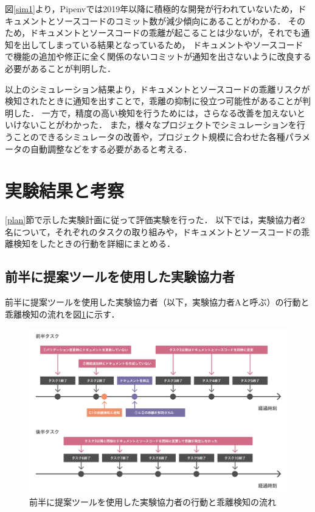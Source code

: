 図\ref{sim1}より，Pipenvでは2019年以降に積極的な開発が行われていないため，ドキュメントとソースコードのコミット数が減少傾向にあることがわかる．
そのため，ドキュメントとソースコードの乖離が起こることは少ないが，それでも通知を出してしまっている結果となっているため，
ドキュメントやソースコードで機能の追加や修正に全く関係のないコミットが通知を出さないように改良する必要があることが判明した．

以上のシミュレーション結果より，ドキュメントとソースコードの乖離リスクが検知されたときに通知を出すことで，乖離の抑制に役立つ可能性があることが判明した．
一方で，精度の高い検知を行うためには，さらなる改善を加えないといけないことがわかった．
また，様々なプロジェクトでシミュレーションを行うことのできるシミュレータの改善や，プロジェクト規模に合わせた各種パラメータの自動調整などをする必要があると考える．


\section{実験結果と考察}
\ref{plan}節で示した実験計画に従って評価実験を行った．
以下では，実験協力者2名について，それぞれのタスクの取り組みや，ドキュメントとソースコードの乖離検知をしたときの行動を詳細にまとめる．

\subsection{前半に提案ツールを使用した実験協力者}
前半に提案ツールを使用した実験協力者（以下，実験協力者Aと呼ぶ）の行動と乖離検知の流れを図\ref{usera}に示す．
\begin{figure}[H]
    \centering
    \includegraphics[width=14cm]{images/usera.png}
    \caption{前半に提案ツールを使用した実験協力者の行動と乖離検知の流れ}
    \label{usera}
\end{figure}

